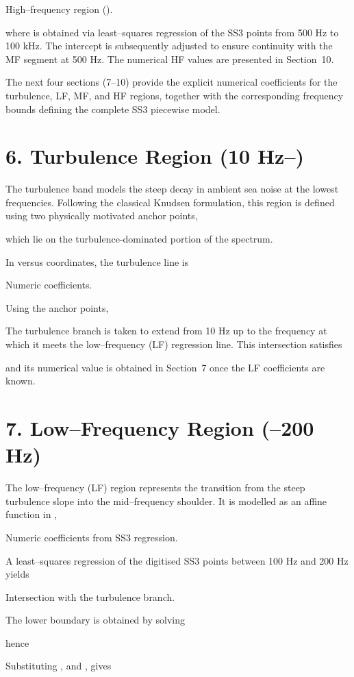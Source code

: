 \documentclass[12pt]{article}
\begin{document}
High–frequency region ().


where  is obtained via least–squares regression of the SS3 points from 500 Hz to 100 kHz. The intercept  is subsequently adjusted to ensure continuity with the MF segment at 500 Hz. The numerical HF values are presented in Section 10.

The next four sections (7–10) provide the explicit numerical coefficients for the turbulence, LF, MF, and HF regions, together with the corresponding frequency bounds defining the complete SS3 piecewise model.

\section*{6. Turbulence Region (10 Hz–)}
The turbulence band models the steep decay in ambient sea noise at the lowest frequencies. Following the classical Knudsen formulation, this region is defined using two physically motivated anchor points,


which lie on the turbulence-dominated portion of the spectrum.

In  versus  coordinates, the turbulence line is


Numeric coefficients.

Using the anchor points,


The turbulence branch is taken to extend from 10 Hz up to the frequency  at which it meets the low–frequency (LF) regression line. This intersection satisfies


and its numerical value is obtained in Section 7 once the LF coefficients are known.

\section*{7. Low–Frequency Region (–200 Hz)}
The low–frequency (LF) region represents the transition from the steep turbulence slope into the mid–frequency shoulder. It is modelled as an affine function in ,


Numeric coefficients from SS3 regression.

A least–squares regression of the digitised SS3 points between 100 Hz and 200 Hz yields


Intersection with the turbulence branch.

The lower boundary  is obtained by solving


hence


Substituting ,  and ,  gives
\end{document}
